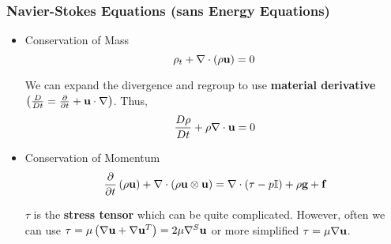 \documentclass{beamer}
\begin{document}
\begin{frame}
  \frametitle{Navier-Stokes Equations (sans Energy Equations)}
  \begin{itemize}
  \item<1->\begin{block}{Conservation of Mass}
    \begin{equation*}
      \rho_t + \nabla\cdot\left( \rho \textbf{u} \right) = 0
    \end{equation*}
  \end{block}
  We can expand the divergence and regroup to use \textbf{material derivative} $\left(\frac{D}{Dt} = \frac{\partial}{\partial t} + \textbf{u}\cdot\nabla\right)$.  Thus,
  \begin{equation*}
    \frac{D \rho}{D t} + \rho\nabla\cdot \textbf{u} = 0
  \end{equation*}
  \item<2->\begin{block}{Conservation of Momentum}
    \begin{equation*}
      \frac{\partial}{\partial t}\left( \rho \textbf{u} \right) + \nabla\cdot\left( \rho \textbf{u}\otimes\textbf{u} \right) = \nabla\cdot\left( \tau - p\mathbb{I}\right) + \rho \textbf{g} + \textbf{f}
    \end{equation*}
  \end{block}
    $\tau$ is the \textbf{stress tensor} which can be quite complicated.  However, often we can use $\tau = \mu \left(\nabla \textbf{u} + \nabla\textbf{u}^{T}\right) = 2\mu\nabla^S\textbf{u}$ or more simplified $\tau = \mu\nabla\textbf{u}$. 
    
  \end{itemize}
\end{frame}
\end{document}
